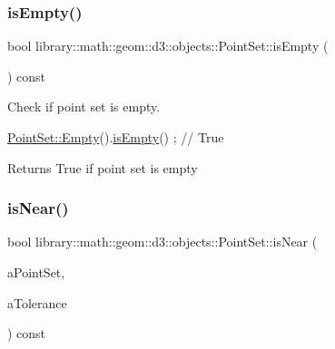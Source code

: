 \mbox{\label{classlibrary_1_1math_1_1geom_1_1d3_1_1objects_1_1_point_set_a1bffbfee716ad81a0a475fa2f7d69f9b}} 
\subsubsection{\texorpdfstring{is\+Empty()}{isEmpty()}}
{\footnotesize\ttfamily bool library\+::math\+::geom\+::d3\+::objects\+::\+Point\+Set\+::is\+Empty (\begin{DoxyParamCaption}{ }\end{DoxyParamCaption}) const}



Check if point set is empty. 


\begin{DoxyCode}
\hyperlink{classlibrary_1_1math_1_1geom_1_1d3_1_1objects_1_1_point_set_af4b649e6c97106bf9f54b2213f10484a}{PointSet::Empty}().\hyperlink{classlibrary_1_1math_1_1geom_1_1d3_1_1objects_1_1_point_set_a1bffbfee716ad81a0a475fa2f7d69f9b}{isEmpty}() ; \textcolor{comment}{// True}
\end{DoxyCode}


\begin{DoxyReturn}{Returns}
True if point set is empty 
\end{DoxyReturn}
\mbox{\label{classlibrary_1_1math_1_1geom_1_1d3_1_1objects_1_1_point_set_acffd730ba7d03b3d1e662fa9cdc61813}} 
\subsubsection{\texorpdfstring{is\+Near()}{isNear()}}
{\footnotesize\ttfamily bool library\+::math\+::geom\+::d3\+::objects\+::\+Point\+Set\+::is\+Near (\begin{DoxyParamCaption}\item[{const \hyperlink{classlibrary_1_1math_1_1geom_1_1d3_1_1objects_1_1_point_set}{Point\+Set} \&}]{a\+Point\+Set,  }\item[{const Real \&}]{a\+Tolerance }\end{DoxyParamCaption}) const}



